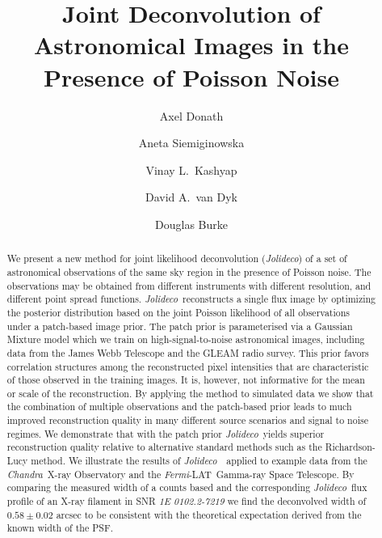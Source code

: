 \documentclass[twocolumn, lineno]{aastex631}
\newcommand{\chandra}{\textit{Chandra}~}
\newcommand{\ferminospace}{\textit{Fermi}-LAT}
\newcommand{\jolideco}{\textit{Jolideco}~}
\newcommand{\jolideconospace}{\textit{Jolideco}}
\begin{document}
    \title{Joint Deconvolution of Astronomical Images in the Presence of Poisson Noise}


    \author[0000-0003-4568-7005]{Axel Donath}
    \author[0000-0002-0905-7375]{Aneta Siemiginowska}
    \author[0000-0002-3869-7996]{Vinay L.\ Kashyap} 
    \author[0000-0002-0816-331X]{David A.\ van Dyk}
    \author[0000-0003-4428-7835]{Douglas Burke}


    \begin{abstract}
    
        We present a new method for joint likelihood deconvolution (\jolideconospace) of a set of astronomical observations of the same sky region in the presence of Poisson noise. 
        The observations may be obtained from different instruments with  different resolution, and different point spread functions. \jolideco reconstructs a single flux image by optimizing the posterior distribution based on the joint Poisson likelihood of all observations under a patch-based image prior. The patch prior is parameterised via a Gaussian Mixture model which we train on high-signal-to-noise astronomical images, including data from the  James Webb Telescope and the GLEAM radio survey. This prior favors correlation structures among the reconstructed pixel intensities that are characteristic of those observed in the training images. It is, however, not informative for the mean or scale of the reconstruction. By applying the method to simulated data we show that the combination of multiple observations and the patch-based prior leads to much improved reconstruction quality in many different source scenarios and signal to noise regimes. We demonstrate that with the patch prior \jolideco yields superior reconstruction quality relative to alternative standard methods such as the Richardson-Lucy method. We illustrate the results of \jolideco\ applied to example data from the \chandra X-ray Observatory and the \ferminospace\ Gamma-ray Space Telescope. By comparing the measured width of a counts based and the corresponding \jolideco flux profile of an X-ray filament in SNR {\it 1E 0102.2-7219} we find the deconvolved width of $0.58\pm 0.02$ arcsec to be consistent with the theoretical expectation derived from the known width of the PSF.
    \end{abstract}
\end{document}
